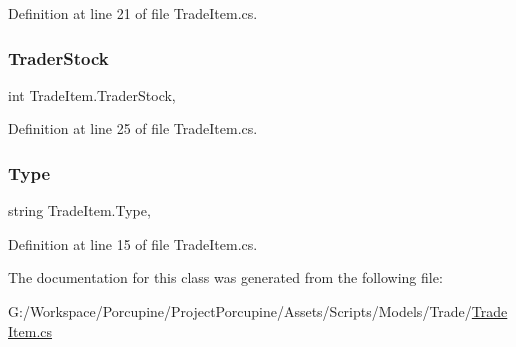 Definition at line 21 of file Trade\+Item.\+cs.

\mbox{\label{class_trade_item_ab737656a53086a552dc8a9fa1b48f109}} 
\subsubsection{\texorpdfstring{Trader\+Stock}{TraderStock}}
{\footnotesize\ttfamily int Trade\+Item.\+Trader\+Stock\hspace{0.3cm}{\ttfamily [get]}, {\ttfamily [set]}}



Definition at line 25 of file Trade\+Item.\+cs.

\mbox{\label{class_trade_item_ad1d3d942ffdbb35cbc2dbc84cd3a1a69}} 
\subsubsection{\texorpdfstring{Type}{Type}}
{\footnotesize\ttfamily string Trade\+Item.\+Type\hspace{0.3cm}{\ttfamily [get]}, {\ttfamily [set]}}



Definition at line 15 of file Trade\+Item.\+cs.



The documentation for this class was generated from the following file\+:\begin{DoxyCompactItemize}
\item 
G\+:/\+Workspace/\+Porcupine/\+Project\+Porcupine/\+Assets/\+Scripts/\+Models/\+Trade/\hyperlink{_trade_item_8cs}{Trade\+Item.\+cs}\end{DoxyCompactItemize}
